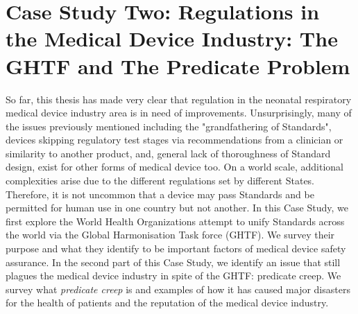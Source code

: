\documentclass[12pt, openany, oneside]{book}
\begin{document}
\chapter{Case Study Two: Regulations in the Medical Device Industry: The GHTF and The Predicate Problem}

So far, this thesis has made very clear that regulation in the neonatal respiratory medical device industry area is in need of improvements. Unsurprisingly, many of the issues previously mentioned including the "grandfathering of Standards", devices skipping regulatory test stages via recommendations from a clinician or similarity to another product, and, general lack of thoroughness of Standard design, exist for other forms of medical device too. On a world scale, additional complexities arise due to the different regulations set by different States. Therefore, it is not uncommon that a device may pass Standards and be permitted for human use in one country but not another. In this Case Study, we first explore the World Health Organizations attempt to unify Standards across the world via the Global Harmonisation Task force (GHTF). We survey their purpose and what they identify to be important factors of medical device safety assurance. In the second part of this Case Study, we identify an issue that still plagues the medical device industry in spite of the GHTF: \textit{}predicate creep. We survey what \textit{predicate creep} is and examples of how it has caused major disasters for the health of patients and the reputation of the medical device industry.\\
\end{document}
